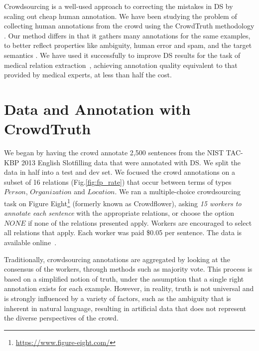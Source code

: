 Crowdsourcing is a well-used approach to correcting the mistakes in DS by scaling out cheap human annotation.  We have been studying the problem of collecting human annotations from the crowd using the CrowdTruth methodology \cite{aroyo2013crowd}.  Our method differs in that it gathers many annotations for the same examples, to better reflect properties like ambiguity, human error and spam, and the target semantics \cite{aroyo2014threesides}. We have used it successfully to improve DS results for the task of medical relation extraction~\cite{DBLP:journals/corr/DumitracheAW17}, achieving annotation quality equivalent to that provided by medical experts, at less than half the cost.

\section{Data and Annotation with CrowdTruth}

We began by having the crowd annotate 2,500 sentences from the NIST TAC-KBP 2013 English Slotfilling data that were annotated with DS.  We split the data in half into a test and dev set. We focused the crowd annotations on a subset of 16 relations (Fig.\ref{fig:fp_rate}) that occur between terms of types $Person$, $Organization$ and $Location$. We ran a multiple-choice crowdsourcing task on Figure Eight\footnote{\url{https://www.figure-eight.com/}} (formerly known as Crowdflower), asking {\em 15 workers to annotate each sentence} with the appropriate relations, or choose the option $NONE$ if none of the relations presented apply. Workers are encouraged to select all relations that apply. Each worker was paid \$0.05 per sentence. The data is available online~\cite{crowdODrelexdata2016}. 

Traditionally, crowdsourcing annotations are aggregated by looking at the consensus of the workers, through methods such as majority vote. This process is based on a simplified notion of truth, under the assumption that a single right annotation exists for each example. However, in reality, truth is not universal and is strongly influenced by a variety of factors, such as the ambiguity that is inherent in natural language, resulting in artificial data that does not represent the diverse perspectives of the crowd.

